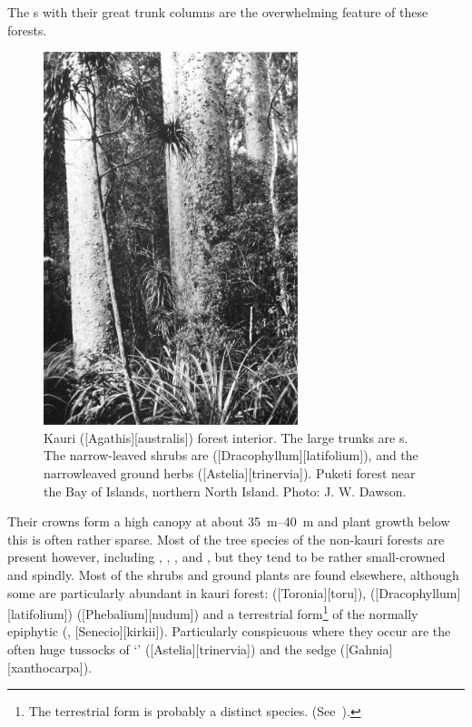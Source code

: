 The s with their great trunk columns are the overwhelming feature of these forests.
\begin{figure}
	\includegraphics[width=0.66\textwidth]{graphics/fig_065}
	\centering
	\caption[Kauri forest interior]{Kauri ([Agathis][australis]) forest interior.
	The large trunks are s.
	The narrow-leaved shrubs are  ([Dracophyllum][latifolium]), and the narrowleaved ground herbs  ([Astelia][trinervia]).
	Puketi forest near the Bay of Islands, northern North Island.
	Photo:  J. W. Dawson.}%
	\label{fig:65kauri}
\end{figure}
Their crowns form a high canopy at about \SIrange{35}{40}{\metre} and plant growth below this is often rather sparse.
Most of the tree species of the non-kauri forests are present however, including , , ,  and , but they tend to be rather small-crowned and spindly.
Most of the shrubs and ground plants are found elsewhere, although some are particularly abundant in kauri forest:  ([Toronia][toru]),  ([Dracophyllum][latifolium])  ([Phebalium][nudum]) and a terrestrial form\footnote{The terrestrial form is probably a distinct species. (See~\cite{eagle1982trees}).} of the normally epiphytic  (, [Senecio][kirkii]).
Particularly conspicuous where they occur are the often huge tussocks of `' ([Astelia][trinervia]) and the sedge  ([Gahnia][xanthocarpa]).

